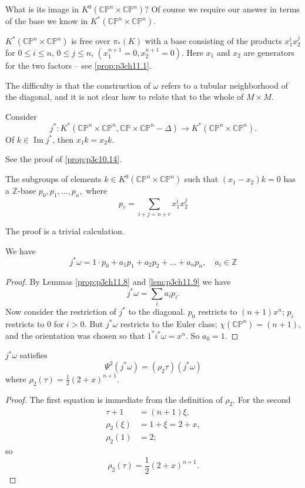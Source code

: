 \documentclass[../main]{subfiles}
\begin{document}
What is its image in $K^0(\mathbb{CP}^n\times\mathbb{CP}^n)$? Of course we require our answer in terms of the base we know in $K^\ast (\mathbb{CP}^n\times\mathbb{CP}^n)$.
\begin{proposition} \label{prop:p3ch11.7}
$K^\ast (\mathbb{CP}^n\times\mathbb{CP}^n)$ is free over $\pi_\ast (K)$ with a base consisting of the products $x_1^ix_2^j$ for $0\leq i \leq n$, $0\leq j\leq n$, $(x_1^{n+1}=0, x_2^{n+1}=0)$. Here $x_1$ and $x_2$ are generators for the two factors -- see \ref{prop:p3ch11.1}.
\end{proposition}
\par The difficulty is that the construction of $\omega$ refers to a tubular neighborhood of the diagonal, and it is not clear how to relate that to the whole of $M\times M$. 
\begin{lemma} \label{prop:p3ch11.8}
Consider \[j^\ast :K^\ast (\mathbb{CP}^n \times \mathbb{CP}^n, \mathbb{CP}\times \mathbb{CP}^n - \Delta) \longrightarrow K^\ast (\mathbb{CP}^n\times \mathbb{CP}^n).\]
Of $k\in\operatorname{Im}j^\ast $, then $x_1 k = x_2 k$.
\end{lemma}
See the proof of \ref{prop:p3c10.14}.
\begin{lemma} \label{lem:p3ch11.9}
The subgroups of elements $k\in K^0(\mathbb{CP}^n\times \mathbb{CP}^n)$ such that $(x_1-x_2)k=0$ has a $\mathbb{Z}$-base $p_0,p_1,...,p_n,$ where
\[p_r=\sum_{i+j=n+r}x_1^ix_2^j\]
\end{lemma}
\par The proof is a trivial calculation.
\begin{lemma}\label{lem:p3ch11.10}
We have \[j^\ast \omega=1\cdot p_0+a_1p_1+a_2p_2+...+a_np_n, \quad a_i\in \mathbb{Z}\]
\end{lemma}
\begin{proof}
By Lemmas \ref{prop:p3ch11.8} and \ref{lem:p3ch11.9} we have 
\[j^\ast \omega=\sum_ia_ip_i.\]
Now consider the restriction of $j^\ast $ to the diagonal. $p_0$ restricts to $(n+1)x^n$; $p_i$ restricts to $0$ for $i>0$. But $j^\ast \omega$ restricts to the Euler class; $\chi(\mathbb{CP}^n)=(n+1)$, and the orientation was chosen so that $1^\ast i^\ast \omega = x^n$. So $a_0=1$.
\end{proof}
\begin{lemma}\label{lem:p3ch11.11}
$j^\ast \omega$ satisfies
\[\Psi^2(j^\ast \omega)=(\rho_2\tau)(j^\ast \omega)\]
where $\rho_2(\tau)=\frac{1}{2}(2+x)^{n+1}$.
\end{lemma}
\begin{proof}
The first equation is immediate from the definition of $\rho_2$. For the second 
\begin{align}
\tau + 1 &= (n+1)\xi, \nonumber \\
\rho_2(\xi) &= 1+\xi = 2+x, \nonumber \\
\rho_2(1)&=2 \nonumber;
\end{align}
so \[\rho_2(\tau)=\frac{1}{2}(2+x)^{n+1}.\]
\end{proof}
\end{document}
